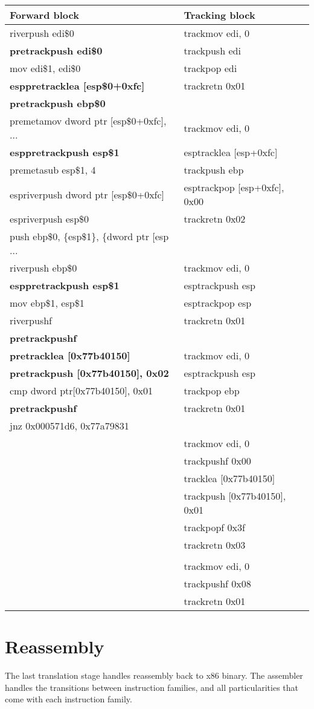 \documentclass[12pt]{report}
\begin{document}
\begin{tabular}{| l | l |}
	\hline
	\textbf{Forward block} & \textbf{Tracking block}\\ \hline
	riverpush edi\$0 & trackmov edi, 0\\
	\textbf{pretrackpush edi\$0} & trackpush edi\\
	mov edi\$1, edi\$0 & trackpop edi\\
	\textbf{esppretracklea [esp\$0+0xfc]} & trackretn 0x01\\
	\textbf{pretrackpush ebp\$0} &\\
	premetamov dword ptr [esp\$0+0xfc], ... & trackmov edi, 0\\
	\textbf{esppretrackpush esp\$1} & esptracklea [esp+0xfc]\\
	premetasub esp\$1, 4 & trackpush ebp\\
	espriverpush dword ptr [esp\$0+0xfc] & esptrackpop [esp+0xfc], 0x00\\
	espriverpush esp\$0 & trackretn 0x02\\
	push ebp\$0, \{esp\$1\}, \{dword ptr [esp ... &\\
	riverpush ebp\$0 & trackmov edi, 0\\
	\textbf{esppretrackpush esp\$1} & esptrackpush esp\\
	mov ebp\$1, esp\$1 & esptrackpop esp\\
	riverpushf & trackretn 0x01\\
	\textbf{pretrackpushf} &\\
	\textbf{pretracklea [0x77b40150]} & trackmov edi, 0\\
	\textbf{pretrackpush [0x77b40150], 0x02} & esptrackpush esp\\
	cmp dword ptr[0x77b40150], 0x01 & trackpop ebp\\
	\textbf{pretrackpushf} & trackretn 0x01\\
	jnz 0x000571d6, 0x77a79831 &\\
	& trackmov edi, 0\\
	& trackpushf 0x00\\
	& tracklea [0x77b40150]\\
	& trackpush [0x77b40150], 0x01\\
	& trackpopf 0x3f\\
	& trackretn 0x03\\
    &\\
	& trackmov edi, 0\\
	& trackpushf 0x08\\
	& trackretn 0x01\\ \hline
\end{tabular}

\section{Reassembly}
\label{sec:reassembly}
The last translation stage handles reassembly back to x86 binary. The assembler handles the transitions between instruction families, and all particularities that come with each instruction family.\\

\appendix
\end{document}
